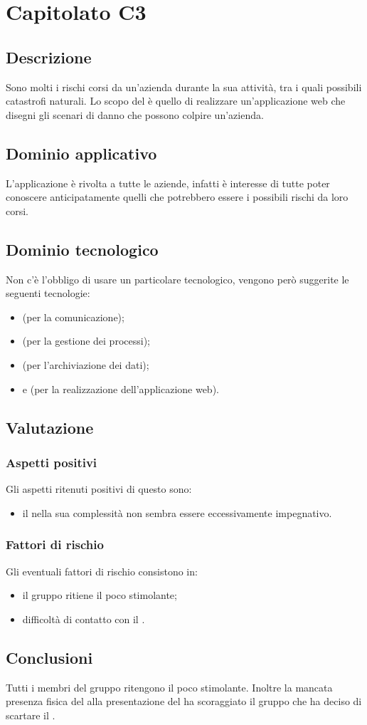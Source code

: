 \section {Capitolato C3}
	\subsection {Descrizione}
		Sono molti i rischi corsi da un'azienda durante la sua attività, tra i quali possibili catastrofi naturali. Lo scopo del  è quello di realizzare un'applicazione web che disegni gli scenari di
		danno che possono colpire un'azienda.
	\subsection {Dominio applicativo}
		L'applicazione è rivolta a tutte le aziende, infatti è interesse di tutte poter conoscere anticipatamente quelli che potrebbero essere i possibili rischi da loro corsi.
	\subsection {Dominio tecnologico}
		Non c'è l'obbligo di usare un particolare  tecnologico, vengono però suggerite le seguenti tecnologie:
		\begin{itemize}
			\item \textbf{} (per la comunicazione);
			\item \textbf{} (per la gestione dei processi);
			\item \textbf{} (per l'archiviazione dei dati);
			\item \textbf{} e \textbf{} (per la realizzazione dell'applicazione web).
		\end{itemize}
	\subsection {Valutazione}
		\subsubsection {Aspetti positivi}
		Gli aspetti ritenuti positivi di questo  sono:
			\begin{itemize}
				\item il  nella sua complessità non sembra essere eccessivamente impegnativo.
			\end{itemize}
		\subsubsection {Fattori di rischio}
		Gli eventuali fattori di rischio consistono in:
			\begin{itemize}
				\item il gruppo ritiene il  poco stimolante;
				\item difficoltà di contatto con il .
			\end{itemize}
	\subsection {Conclusioni}
		Tutti i membri del gruppo ritengono il  poco stimolante. Inoltre la mancata presenza fisica del  alla presentazione del  ha scoraggiato il gruppo che ha deciso di scartare il .
